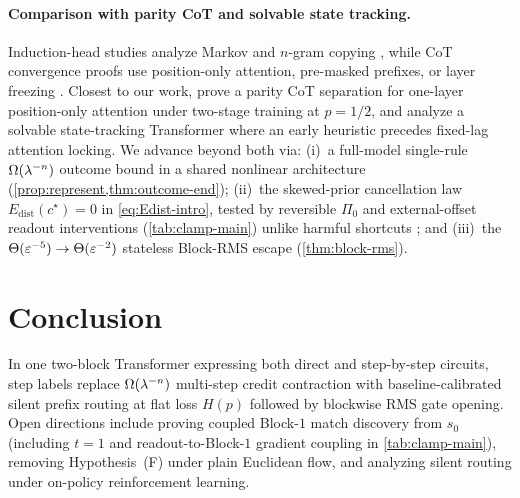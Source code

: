 \paragraph{Comparison with parity CoT and solvable state tracking.}
Induction-head studies analyze Markov and $n$-gram copying \citep{olsson2022context,bietti2023birth,edelman2024evolution,nichani2024how,dangelo2026induction}, while CoT convergence proofs use position-only attention, pre-masked prefixes, or layer freezing \citep{cabannes2024iteration,wen2024sparse,huang2025cotgd,huang2025lengthgen}. Closest to our work, \citet{kim2024parity} prove a parity CoT separation for one-layer position-only attention under two-stage training at $p = 1/2$, and \citet{forner2026learning} analyze a solvable state-tracking Transformer where an early heuristic precedes fixed-lag attention locking. We advance beyond both via: (i)~a full-model single-rule $\Omega(\lambda^{-n})$ outcome bound in a shared nonlinear architecture (\cref{prop:represent,thm:outcome-end}); (ii)~the skewed-prior cancellation law $E_{\mathrm{dist}}(c^\star) = 0$ in \cref{eq:Edist-intro}, tested by reversible $\Pi_0$ and external-offset readout interventions (\cref{tab:clamp-main}) unlike harmful shortcuts \citep{labonte2026shortcut,glasgow2024sgd,reddy2024mechanistic,panigrahi2025progressive,li2025noise,lai2026relu,zhou2026multiindex}; and (iii)~the $\Theta(\varepsilon^{-5}) \to \Theta(\varepsilon^{-2})$ stateless Block-RMS escape (\cref{thm:block-rms}).

\section{Conclusion}
\label{sec:conclusion}
\label{sec:discussion}

In one two-block Transformer expressing both direct and step-by-step circuits, step labels replace $\Omega(\lambda^{-n})$ multi-step credit contraction with baseline-calibrated silent prefix routing at flat loss $H(p)$ followed by blockwise RMS gate opening. Open directions include proving coupled Block-$1$ match discovery from $s_0$ (including $t = 1$ and readout-to-Block-$1$ gradient coupling in \cref{tab:clamp-main}), removing Hypothesis~(F) under plain Euclidean flow, and analyzing silent routing under on-policy reinforcement learning.
